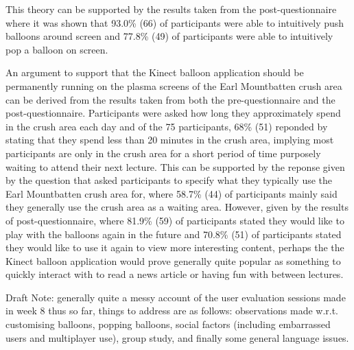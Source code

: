 This theory can be supported by the results taken from the post-questionnaire where it was shown that 93.0\% (66) of participants were able to intuitively push balloons around screen and 77.8\% (49) of participants were able to intuitively pop a balloon on screen.

An argument to support that the Kinect balloon application should be permanently running on the  plasma screens of the Earl Mountbatten crush area can be derived from the results taken from both the pre-questionnaire and the post-questionnaire. Participants were asked how long they approximately spend in the crush area each day and of the 75 participants, 68\% (51) reponded by stating that they spend less than 20 minutes in the crush area, implying most participants are only in the crush area for a short period of time purposely waiting to attend their next lecture. This can be supported by the reponse given by the question that asked participants to specify what they typically use the Earl Mountbatten crush area for, where 58.7\% (44) of participants mainly said they generally use the crush area as a waiting area. However, given by the results of post-questionnaire, where 81.9\% (59) of participants stated they would like to play with the balloons again in the future and 70.8\% (51) of participants stated they would like to use it again to view more interesting content, perhaps the the Kinect balloon application would prove generally quite popular as something to quickly interact with to read a news article or having fun with between lectures.

Draft Note: generally quite a messy account of the user evaluation sessions made in week 8 thus so far, things to address are as follows: observations made w.r.t. customising balloons, popping balloons, social factors (including embarrassed users and multiplayer use), group study, and finally some general language issues.
